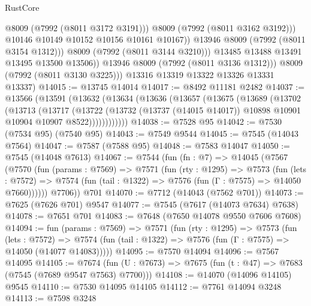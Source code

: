 \begin{lexlean}{RustCore}
\begin{coremodule}
                          @8009
                          (@7992 (@8011 @3172 @3191)))
                        @8009
                        (@7992 (@8011 @3162 @3192)))
                      @10146
                      @10149
                      @10152
                      @10156
                      @10161
                      @10167))
                  @13946
                  @8009
                  (@7992 (@8011 @3154 @1312)))
                @8009
                (@7992 (@8011 @3144 @3210)))
              @13485
              @13488
              @13491
              @13495
              @13500
              @13506))
          @13946
          @8009
          (@7992 (@8011 @3136 @1312)))
        @8009
        (@7992 (@8011 @3130 @3225)))
      @13316
      @13319
      @13322
      @13326
      @13331
      @13337)
@14015 := @13745 @14014
@14017 := @8492 @11181 @2482
@14037 := @13566
    (@13591
      (@13632
        (@13634
          (@13636
            (@13657
              (@13675
                (@13689
                  (@13702
                    (@13713
                      (@13717
                        (@13722
                          (@13732
                            (@13737 (@14015 @14017))
                            @10898
                            @10901
                            @10904
                            @10907
                            @8522))))))))))))
@14038 := @7528 @95
@14042 := @7530 (@7534 @95) (@7540 @95)
@14043 := @7549 @9544
@14045 := @7545 (@14043 @7564)
@14047 := @7587 (@7588 @95)
@14048 := @7583 @14047
@14050 := @7545 (@14048 @7613)
@14067 := @7544
    (fun (fn : @7) =>
    @14045
      (@7567
        (@7570
          (fun (params : @7569) =>
          @7571
            (fun (rty : @1295) =>
            @7573
              (fun (lets : @7572) =>
              @7574 (fun (tail : @1322) => @7576 (fun (Γ : @7575) => @14050 @7660))))))
        @7706))
    @701
@14070 := @7712 (@14043 (@7562 @701))
@14073 := @7625 (@7626 @701) @9547
@14077 := @7545 (@7617 (@14073 @7634) @7638)
@14078 := @7651 @701
@14083 := @7648 (@7650 @14078 @9550 @7606 @7608)
@14094 := fun (params : @7569) =>
  @7571
    (fun (rty : @1295) =>
    @7573
      (fun (lets : @7572) =>
      @7574 (fun (tail : @1322) => @7576 (fun (Γ : @7575) => @14050 (@14077 @14083)))))
@14095 := @7570 @14094
@14096 := @7567 @14095
@14105 := @7674
    (fun (U : @7673) => @7675 (fun (t : @47) => @7683 (@7545 (@7689 @9547 @7563) @7700)))
@14108 := @14070 (@14096 @14105) @9545
@14110 := @7530 @14095 @14105
@14112 := @7761 @14094 @3248
@14113 := @7598 @3248

\end{coremodule}
\end{lexlean}
